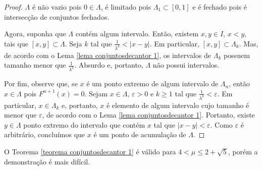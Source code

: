 \begin{proof}
$\Lambda$ é não vazio pois $0 \in \Lambda$, é limitado pois $\Lambda_1 \subset [0, 1]$ e é fechado pois é intersecção de conjuntos fechados.

Agora, suponha que $\Lambda$ contém algum intervalo. Então, existem $x, y \in I$, $x < y$, tais que $[x, y] \subset \Lambda$. Seja $k$ tal que $\frac{1}{\lambda^k} < |x - y|$. Em particular, $[x, y] \subset \Lambda_k$. Mas, de acordo com o Lema \ref{lema conjuntosdecantor 1}, os intervalos de $\Lambda_k$ possuem tamanho menor que $\frac{1}{\lambda^k}$. Absurdo e, portanto, $\Lambda$ não possui intervalos.

Por fim, observe que, se $x$ é um ponto extremo de algum intervalo de $\Lambda_n$, então $x \in \Lambda$ pois $F^{n+1}(x) = 0$. Sejam $x \in \Lambda$, $\varepsilon > 0$ e $k \geq 1$ tal que $\frac{1}{\lambda^k} < \varepsilon$. Em particular, $x \in \Lambda_k$ e, portanto, $x$ é elemento de algum intervalo cujo tamanho é menor que $\varepsilon$, de acordo com o Lema \ref{lema conjuntosdecantor 1}. Portanto, existe $y \in \Lambda$ ponto extremo do intervalo que contém $x$ tal que $|x - y| < \varepsilon$. Como $\varepsilon$ é arbitrário, concluímos que $x$ é um ponto de acumulação de $\Lambda$.
\end{proof}

\begin{remark}
O Teorema \ref{teorema conjuntosdecantor 1} é válido para $4 < \mu \leq 2 + \sqrt{5}$, porém a demonstração é mais difícil.
\end{remark}